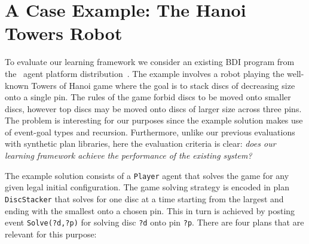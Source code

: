 \section{A Case Example: The Hanoi Towers Robot}\label{sec:hanoi}

\newcommand{\entity}[1]{\texttt{#1}}

To evaluate our learning framework we consider an existing BDI program
from the \JACK\ agent platform
distribution~\cite{BusettaRHL:AL99-JACK}.
The example involves a robot playing the well-known Towers of Hanoi game where the goal is to stack discs of decreasing size onto a single pin. The rules of the game forbid discs to be moved onto smaller discs, however top discs may be moved onto discs of larger size across three pins. The problem is interesting for our purposes since the example solution makes use of event-goal types and recursion. Furthermore, unlike our previous evaluations \cite{Airiau:IJAT:09,Singh:AAMAS10} with synthetic plan libraries, here the evaluation criteria is clear: \emph{does our learning framework achieve the performance of the existing system?}


The example solution consists of a \entity{Player} agent that solves the game for 
any given legal initial configuration. The game solving strategy is encoded in plan
\entity{DiscStacker} that solves for one disc at a time starting from the largest
and ending with the smallest onto a chosen pin. This in turn is achieved by posting 
event \entity{Solve(?d,?p)} for solving disc \entity{?d} 
onto pin \entity{?p}. There are four plans that are relevant for this purpose:
%

